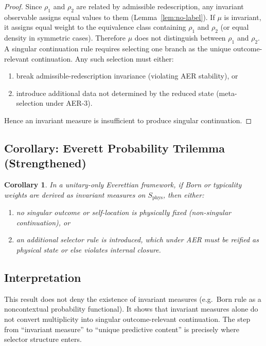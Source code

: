 \documentclass[11pt]{article}
\newtheorem{corollary}[definition]{Corollary}
\theoremstyle{remark}
\theoremstyle{plain}
\begin{document}
\begin{proof}
Since $\rho_1$ and $\rho_2$ are related by admissible redescription,
any invariant observable assigns equal values to them
(Lemma~\ref{lem:no-label}).
If $\mu$ is invariant, it assigns equal weight to the equivalence class
containing $\rho_1$ and $\rho_2$ (or equal density in symmetric cases).
Therefore $\mu$ does not distinguish between $\rho_1$ and $\rho_2$.
A singular continuation rule requires selecting one branch as
the unique outcome-relevant continuation.
Any such selection must either:
\begin{enumerate}
\item break admissible-redescription invariance (violating AER stability), or
\item introduce additional data not determined by the reduced state
(meta-selection under AER-3).
\end{enumerate}
Hence an invariant measure is insufficient to produce singular continuation.
\end{proof}

\subsection{Corollary: Everett Probability Trilemma (Strengthened)}

\begin{corollary}
In a unitary-only Everettian framework,
if Born or typicality weights are derived as invariant measures
on $S_{\mathrm{phys}}$,
then either:
\begin{enumerate}
\item no singular outcome or self-location is physically fixed
(non-singular continuation), or
\item an additional selector rule is introduced,
which under AER must be reified as physical state or else violates internal closure.
\end{enumerate}
\end{corollary}

\subsection{Interpretation}

This result does not deny the existence of invariant measures
(e.g.\ Born rule as a noncontextual probability functional).
It shows that invariant measures alone do not convert multiplicity
into singular outcome-relevant continuation.
The step from ``invariant measure'' to ``unique predictive content''
is precisely where selector structure enters.
\end{document}
